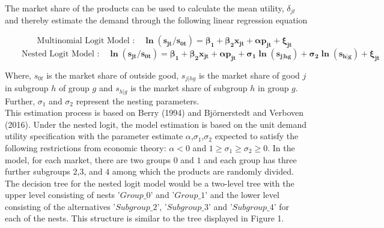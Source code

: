 \documentclass[a4paper,11pt]{article}
\begin{document}
    The market share of the products can be used to calculate the mean utility, $\delta_{jt}$ and thereby estimate the demand through the following linear regression equation

    \begin{equation*}
        \qquad \text{Multinomial Logit Model :} \quad \mathbf{\ln(s_{jt}/s_{0t}) = \beta_{1} + \beta_{2}x_{jt} + \alpha p_{jt} + \xi_{jt}}
    \end{equation*}
    \begin{equation*}
        \qquad \text{Nested Logit Model :} \quad \mathbf{\ln(s_{jt}/s_{0t}) = \beta_{1} + \beta_{2}x_{jt} + \alpha p_{jt} + \sigma_{1}\ln(s_{j|hg}) + \sigma_{2}\ln(s_{h|g}) + \xi_{jt}}
    \end{equation*}

    Where, $s_{0t}$ is the market share of outside good, $s_{j|hg}$ is the market share of good $j$ in subgroup $h$ of group $g$ and $s_{h|g}$ is the market share of subgroup $h$ in group $g$. Further, $\sigma_{1}$ and $\sigma_{2}$ represent the nesting parameters.\\
    
    This estimation process is based on Berry (1994) and Björnerstedt and Verboven (2016). Under the nested logit, the model estimation is based on the unit demand utility specification with the parameter estimate $\alpha$,$\sigma_{1}$,$\sigma_{2}$ expected to satisfy the following restrictions from economic theory: $\alpha<0$ and $1 \geq \sigma_{1} \geq \sigma_{2} \geq 0$. In the model, for each market, there are two groups $0$ and $1$ and each group has three further subgroups $2$,$3$, and $4$ among which the products are randomly divided. The decision tree for the nested logit model would be a two-level tree with the upper level consisting of nests '$Group\_0$' and '$Group\_1$' and the lower level consisting of the alternatives '$Subgroup\_2$', '$Subgroup\_3$' and '$Subgroup\_4$' for each of the nests. This structure is similar to the tree displayed in Figure 1.\\  
\end{document}
